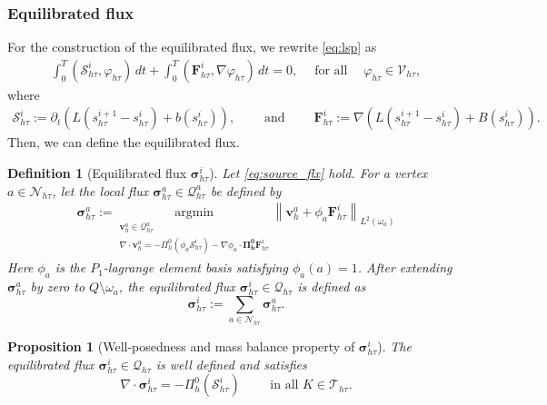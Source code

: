 \documentclass[review,11pt]{article}
\numberwithin{equation}{section}
\def \oma {\omega_a}
\def \t  {\tau}
\def \htt {{h\tau}}
\def \calN {\mathcal{N}}
\def \calQ {\bm{\mathcal{Q}}}
\def \calS {\mathcal{S}}
\def \calT {\mathcal{T}}
\def \flx {\bm{\sigma}_{\htt}^i}
\def \flxa {\bm{\sigma}^a_{\htt}}
\def \Shti {\calS_\htt^i}
\def \Fhti {\bm{F}_\htt^i}
\newtheorem{proposition}[proposition]{Proposition}
\newtheorem{definition}[definition]{Definition}
\begin{document}
\subsubsection{Equilibrated flux}\label{sec:equilibrated_fluxes}
For the construction of the equilibrated flux, we rewrite \eqref{eq:lsp} as 
\begin{align}\label{eq:source_flx}
 \int_0^T ( \Shti, \varphi_{h\tau} ) \, dt
 + \int_0^T ( \Fhti, \nabla \varphi_{h\tau} ) \, dt = 0,
 \quad \;\text{for all}\quad\; \varphi_{h\tau} \in \mathcal{V}_{h\tau},
\end{align}
where
\begin{align}\label{eq:source_flx_Lscheme}
    \Shti:= \partial_t \left( L(s^{i+1}_{h\t} - s^i_{h\t}) + b(s^i_{h\t}) \right), \qquad\;\text{and}\; \qquad \Fhti:= \nabla \left( L(s^{i+1}_{h\t} - s^i_{h\t}) + B(s^i_{h\t}) \right).
\end{align}
Then, we can define the equilibrated flux.
\begin{definition}[Equilibrated flux $\flx$]\label{def:equilibrated}
    Let \eqref{eq:source_flx} hold. For a vertex $a\in \calN_\htt$, let the local flux $\flxa\in \calQ_\htt^a$ be defined by
    \begin{align}\label{eq:optimization}
        \flxa:= \underset{\substack{\bm{v}^a_h\in\calQ_\htt^a\\
       \nabla\cdot \bm{v}^a_h = -\Pi_h^0 (\phi_a \Shti) - \nabla\phi_a \cdot \bm{\Pi_h^0} \Fhti}}{\mathrm{argmin}} \left\| \bm{v}^a_h + \phi_a \Fhti\right\|_{L^2(\oma)}
    \end{align}
    Here $\phi_a$ is the $P_1$-lagrange element basis satisfying $\phi_a(a)=1$. After extending $\flxa$ by zero to $Q\setminus \oma$, the equilibrated flux $\flx\in\calQ_\htt$ is defined as
    \[
    \flx:=\sum_{a\in \calN_\htt} \flxa.
    \]
\end{definition}
\begin{proposition}[Well-posedness and mass balance property of $\flx$]\label{mass_balance_property}
    The equilibrated flux $\flx \in \calQ_\htt$ is well defined and satisfies 
    \[
    \nabla\cdot \flx= -\Pi_h^0(\Shti) \qquad \text{ in all } K\in \calT_\htt.
    \]
\end{proposition}
\end{document}
